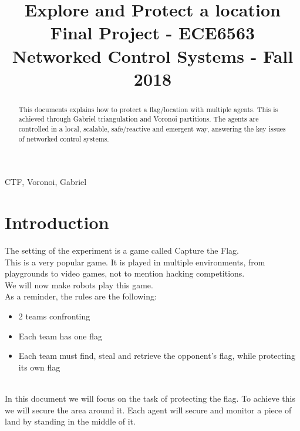 \documentclass[journal]{IEEEtran}
\begin{document}
\title{Explore and Protect a location\\
{\footnotesize Final Project - ECE6563 Networked Control Systems - Fall 2018}
}

\author{
}


\maketitle
\thispagestyle{empty}

\begin{abstract}
This documents explains how to protect a flag/location with multiple agents. This is achieved through Gabriel triangulation and Voronoi partitions. The agents are controlled in a local, scalable, safe/reactive and emergent way, answering the key issues of networked control systems.
\end{abstract}

\begin{IEEEkeywords}
CTF, Voronoi, Gabriel
\end{IEEEkeywords}

\section{Introduction}

The setting of the experiment is a game called Capture the Flag.\\

This is a very popular game. It is played in multiple environments, from playgrounds to video games, not to mention hacking competitions.\\
We will now make robots play this game.\\

As a reminder, the rules are the following:
\begin{itemize}
    \item 2 teams confronting
    \item Each team has one flag
    \item Each team must find, steal and retrieve the opponent's flag, while protecting its own flag
\end{itemize}
\ \\
In this document we will focus on the task of protecting the flag.
To achieve this we will secure the area around it.
Each agent will secure and monitor a piece of land by standing in the middle of it.\\
\end{document}
